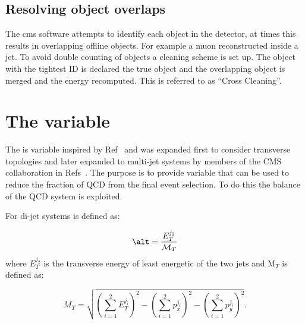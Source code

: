 \subsection{Resolving object overlaps} %
\label{sub:cross_cleaning}
The \ac{cms} software attempts to identify each object in the detector, at 
times this results in overlapping offline objects. For example a muon 
reconstructed inside a jet. To avoid double counting of objects a cleaning 
scheme is set up. The object with the tightest ID is declared the true object 
and the overlapping object is merged and the energy recomputed. This is referred to as ``Cross Cleaning''.


\section{The \alt variable} %
\label{sec:the_alpha___t_variable_}
The \alt is variable inspired by Ref~ and was expanded first to consider transverse topologies and later expanded to  multi-jet systems by members of the CMS collaboration in  Refs~. The purpose is to provide variable that can be used to reduce the fraction of QCD from the final event selection. To do this the balance of the QCD system is exploited.

For di-jet systems \alt is defined as:

\begin{equation}
  \alt = \frac{E_{T}^{j_{2}}}{\mathcal{M}_{T}}
  \label{eq:transverseMass}
\end{equation}
where $E_{T}^{j_{2}}$ is the transverse energy of least energetic of the two 
jets and M$_{T}$ is defined as:

\begin{equation}
  M_{T} = \sqrt{\left(\sum^{2}_{i=1}E_{T}^{j_{i}}\right)^{2} - \left(\sum^{2}_{i=1}p_{x}^{j_{i}}\right)^{2} - \left(\sum^{2}_{i=1}p_{y}^{j_{i}}\right)^{2}}.
\end{equation}

